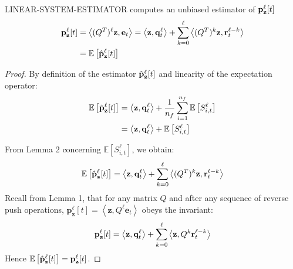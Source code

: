 \begin{lemma}
LINEAR-SYSTEM-ESTIMATOR computes an unbiased estimator of ${\mathbf{p}}_\mathbf{z}^{\ell}[t]$
\begin{align*}
{\mathbf{p}}_\mathbf{z}^{\ell}[t] &=  \left< (Q^T)^{\ell} \mathbf{z}, \mathbf{e}_t \right>= \left<\mathbf{z}, \mathbf{q}_t^{\ell} \right> + \sum_{k=0}^{\ell} \left<(Q^T)^k\mathbf{z} , \mathbf{r}_t^{\ell-k}\right>\\
&= \mathbb{E}\left[\hat{\mathbf{p}}_\mathbf{z}^{\ell}[t] \right]
\end{align*}
\end{lemma}

\begin{proof}
By definition of the estimator $\hat{\mathbf{p}}_\mathbf{z}^{\ell}[t]$ and linearity of the expectation operator:
\begin{align*}
\mathbb{E}\left[\hat{\mathbf{p}}_\mathbf{z}^{\ell}[t]\right] &= \left<\mathbf{z}, \mathbf{q}_t^{\ell} \right> + \frac{1}{n_f}\sum_{i=1}^{n_f} \mathbb{E}\left[S_{i, t}^{\ell}\right] \\
&= \left<\mathbf{z}, \mathbf{q}_t^{\ell} \right> + \mathbb{E}\left[S_{i, t}^{\ell}\right]
\end{align*}

From Lemma 2 concerning $\mathbb{E}\left[S_{i, t}^{\ell}\right]$, we obtain:
\begin{align*}
\mathbb{E}\left[\hat{\mathbf{p}}_\mathbf{z}^{\ell}[t] \right] = \left<\mathbf{z}, \mathbf{q}_t^{\ell} \right> + \sum_{k=0}^{\ell} \left<(Q^T)^k\mathbf{z}, \mathbf{r}_t^{\ell-k}\right>
\end{align*}
Recall from Lemma 1, that for any matrix $Q$ and after any sequence of reverse push operations, $\mathbf{p}_\mathbf{z}^{\ell}[t] = \left<\mathbf{z}, Q^{\ell} \mathbf{e}_t \right>$ obeys the invariant: 
$${\mathbf{p}}_\mathbf{z}^{\ell}[t] = \left<\mathbf{z}, \mathbf{q}_t^{\ell} \right> + \sum_{k=0}^{\ell} \left<\mathbf{z}, Q^k\mathbf{r}_t^{\ell-k}\right>$$
Hence $\mathbb{E}\left[\hat{\mathbf{p}}_\mathbf{z}^{\ell}[t] \right] = {\mathbf{p}}_\mathbf{z}^{\ell}[t]$.
\end{proof}
